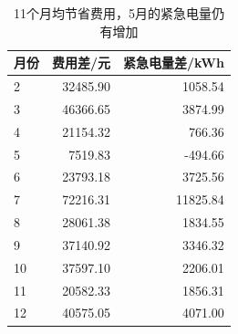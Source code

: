 \begin{table}[H]
\centering\small
\caption{11个月均节省费用，5月的紧急电量仍有增加}
\label{tab:update_robustness}
\begin{tabular}{lrr}\toprule
月份 & 费用差/元 & 紧急电量差/kWh \\\midrule
2 & 32485.90 & 1058.54 \\
3 & 46366.65 & 3874.99 \\
4 & 21154.32 & 766.36 \\
5 & 7519.83 & -494.66 \\
6 & 23793.18 & 3725.56 \\
7 & 72216.31 & 11825.84 \\
8 & 28061.38 & 1834.55 \\
9 & 37140.92 & 3346.32 \\
10 & 37597.10 & 2206.01 \\
11 & 20582.33 & 1856.31 \\
12 & 40575.05 & 4071.00 \\
\bottomrule\end{tabular}
\end{table}
